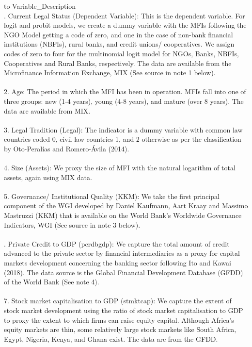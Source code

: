 \documentclass[a4paper,nobind]{templates/ociamthesis}
\begin{document}
\begin{table}

\caption{\label{tab:unnamed-chunk-24}Description of Variables}
\centering
\begin{tabu} to 
\toprule
Variable\_Description\\
. Current Legal Status (Dependent Variable): This is the dependent variable. For logit and probit models, we create a dummy variable with the MFIs following the NGO Model getting a code of zero, and one in the case of non-bank financial institutions (NBFIs), rural banks, and credit unions/ cooperatives. We assign codes of zero to four for the multinomial logit model for NGOs, Banks, NBFIs, Cooperatives and Rural Banks, respectively. The data are available from the Microfinance Information Exchange, MIX (See source in note 1 below).\\
\\
2.  Age: The period in which the MFI has been in operation. MFIs fall into one of three groups: new (1-4 years), young (4-8 years), and mature (over 8 years). The data are available from MIX.\\
\\
3. Legal Tradition (Legal): The indicator is a dummy variable with common law countries coded 0, civil law countries 1, and 2 otherwise as per the classification by Oto-Peralías and Romero-Ávila (2014).\\
\addlinespace
\\
4. Size (Assets): We proxy the size of MFI with the natural logarithm of total assets, again using MIX data.\\
\\
5. Governance/ Institutional Quality (KKM): We take the first principal component of the WGI developed by Daniel Kaufmann, Aart Kraay and Massimo Mastruzzi (KKM) that is available on the World Bank's Worldwide Governance Indicators, WGI (See source in note 3 below).\\
\\
. Private Credit to GDP (pcrdbgdp): We capture the total amount of credit advanced to the private sector by financial intermediaries as a proxy for capital markets development concerning the banking sector following Ito and Kawai (2018). The data source is the Global Financial Development Database (GFDD) of the World Bank (See note 4).\\
\\
7. Stock market capitalisation to GDP (stmktcap): We capture the  extent of stock market development using the ratio of stock market capitalisation to GDP to proxy the extent to which firms can raise equity capital. Although Africa's equity markets are thin, some relatively large stock markets like South Africa, Egypt, Nigeria, Kenya, and Ghana exist. The data are from the GFDD.\\

\end{tabu}
\end{table}
\end{document}

